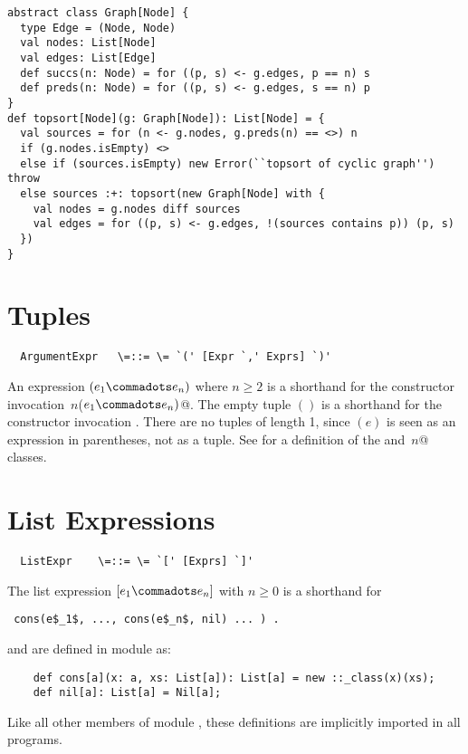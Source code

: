 \documentclass[11pt]{report}
\begin{document}
\begin{itemize}
{\example
\begin{verbatim}
abstract class Graph[Node] {
  type Edge = (Node, Node)
  val nodes: List[Node]
  val edges: List[Edge]
  def succs(n: Node) = for ((p, s) <- g.edges, p == n) s
  def preds(n: Node) = for ((p, s) <- g.edges, s == n) p
}
def topsort[Node](g: Graph[Node]): List[Node] = {
  val sources = for (n <- g.nodes, g.preds(n) == <>) n
  if (g.nodes.isEmpty) <>
  else if (sources.isEmpty) new Error(``topsort of cyclic graph'') throw
  else sources :+: topsort(new Graph[Node] with {
    val nodes = g.nodes diff sources
    val edges = for ((p, s) <- g.edges, !(sources contains p)) (p, s)
  })
}
\end{verbatim}
}

\section{Tuples}

\syntax\begin{verbatim}
  ArgumentExpr   \=::= \= `(' [Expr `,' Exprs] `)'
\end{verbatim}

An expression $(e_1 \commadots e_n)$ where $n \geq 2$
is a shorthand for the constructor invocation
\verb@Tuple$\,n$($e_1 \commadots e_n)$@.
The empty tuple $()$ is a shorthand for the constructor invocation
\verb@Unit@.
There are no tuples of length 1, since $(e)$ is seen as an expression
in parentheses, not as a tuple.
See 
for a definition of the \verb@Unit@ and \verb@Tuple$\,n$@ classes.

\section{List Expressions}
\label{sec:list-exprs}

\syntax\begin{verbatim}
  ListExpr	  \=::= \= `[' [Exprs] `]'
\end{verbatim}

The list expression $[ e_1 \commadots e_n ]$ with $n \geq 0$ is a
shorthand for
\begin{verbatim}
 cons(e$_1$, ..., cons(e$_n$, nil) ... ) .
\end{verbatim}
\verb@cons@ and \verb@nil@ are defined in module \verb@Predef@ as:
\begin{verbatim}
    def cons[a](x: a, xs: List[a]): List[a] = new ::_class(x)(xs);
    def nil[a]: List[a] = Nil[a];
\end{verbatim}
Like all other members of module \verb@Predef@, these definitions
are implicitly imported in all programs.


\end{itemize}
\end{document}

